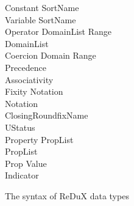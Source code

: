 \begin{figure}[htbp]
\begin{center}
{\begin{minipage}{6in}
\begin{tabbing}
{\vs Constant} \>  \ts{:} {\vs SortName} \\
{\vs Variable} \>  \ts{:} {\vs SortName} \\
{\vs Operator} \>  \ts{:} {\vs DomainList} \ts{->} {\vs Range} \\
{\vs DomainList}   \galt \gepsilon \\
{\vs Coercion} \>  \ts{:} {\vs Domain} \ts{->} {\vs Range} \\
{\vs Precedence} \>   \\
{\vs Associativity} \>  \ts{:} 
   \\
{\vs Fixity} \>  \ts{:} {\vs Notation} \\
{\vs Notation} \> \gprod {} \galt {} \galt {} \galt {} \\
  \>\> \galt {} \galt {} {\vs ClosingRoundfixName} \\
{\vs UStatus} \>  \ts{:}  \\
{\vs Property} \>  \ts{:} {\vs PropList} \\
{\vs PropList} \>   \\
{\vs Prop} \>  \ts{=} {\vs Value} \\
{\vs Indicator} \> \gprod {} \galt {} \galt {}
\end{tabbing}
\end{minipage}
} %
\caption{The syntax of ReDuX data types}
\label{dtgram}
\end{center}
\end{figure}
